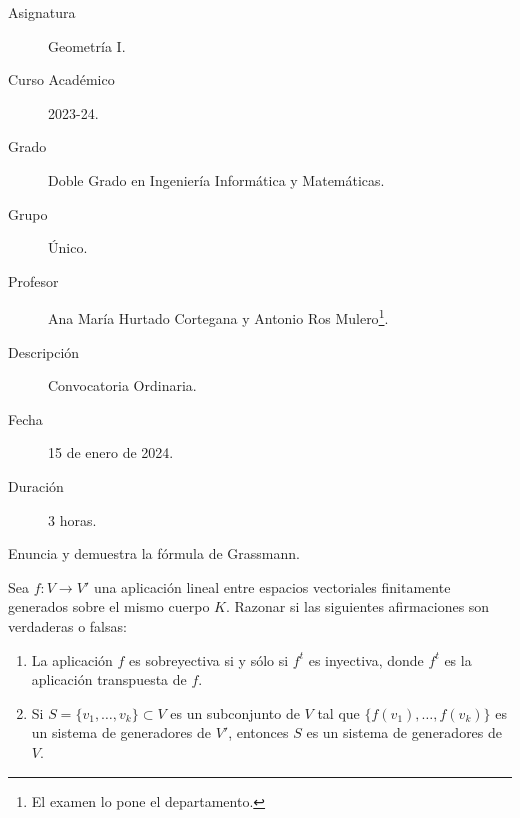 \documentclass[12pt]{article}
\begin{document}

    
    

    \begin{description}
        \item[Asignatura] Geometría I.
        \item[Curso Académico] 2023-24.
        \item[Grado] Doble Grado en Ingeniería Informática y Matemáticas.
        \item[Grupo] Único.
        \item[Profesor] Ana María Hurtado Cortegana y Antonio Ros Mulero\footnote{El examen lo pone el departamento.}.
        \item[Descripción] Convocatoria Ordinaria.
        \item[Fecha] 15 de enero de 2024.
        \item[Duración] 3 horas.
    
    \end{description}
    \newpage

    \begin{ejercicio}
        [2.5 puntos] Enuncia y demuestra la fórmula de Grassmann.
    \end{ejercicio}
        
    \begin{ejercicio}
        [1.5 puntos] Sea $f : V \to V'$ una aplicación lineal entre espacios vectoriales finitamente generados sobre el mismo cuerpo $K$. Razonar si las siguientes afirmaciones son verdaderas o falsas:
        \begin{enumerate}
            \item La aplicación $f$ es sobreyectiva si y sólo si $f^t$ es inyectiva, donde $f^t$ es la aplicación transpuesta de $f$.
            \item Si $S = \{v_1, \ldots, v_k\} \subset V$ es un subconjunto de $V$ tal que $\{f(v_1), \ldots, f(v_k)\}$ es un sistema de generadores de $V'$, entonces $S$ es un sistema de generadores de $V$.
        \end{enumerate}
    \end{ejercicio}
        
\end{document}
